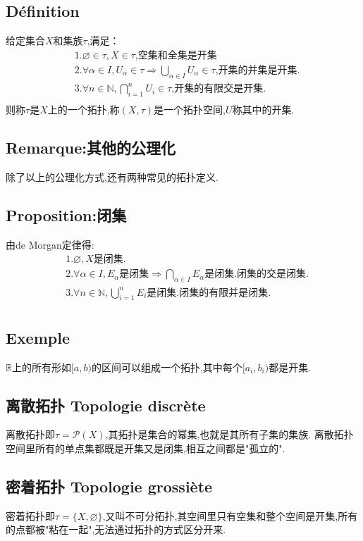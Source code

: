 \documentclass[12pt, a4paper, oneside]{ctexbook}
\newcommand{\R }{\mathbb{R}}%
\begin{document}
  \subsection{Définition}
  给定集合$X$和集族$\tau $,满足：
  $$
  \begin{aligned}&
  1.\varnothing\in\tau , X\in\tau\text{,空集和全集是开集}\\&
  2.\forall\alpha\in I,U_\alpha\in\tau \Rightarrow\bigcup_{\alpha\in I}U_\alpha\in\tau \text{,开集的并集是开集.}\\&
  3.\forall n\in\mathbb{N},\bigcap_{i=1}^{n}U_i\in\tau \text{,开集的有限交是开集.}\\
    \end{aligned}
  $$
  则称$\tau $是$X$上的一个拓扑,称$(X,\tau)$是一个拓扑空间,$U$称其中的开集.
  \subsection{Remarque:其他的公理化}
  除了以上的公理化方式,还有两种常见的拓扑定义.
  \subsection{Proposition:闭集}
  由de Morgan定律得:
  $$
  \begin{aligned}&
  1.\varnothing, X{ 是闭集.}\\&
  2.\forall\alpha\in I,E_\alpha\text{是闭集} \Rightarrow\bigcap_{\alpha\in I}E_\alpha \text{是闭集.闭集的交是闭集.}\\&
  3.\forall n\in\mathbb{N},\bigcup_{i=1}^{n}E_i \text{是闭集.闭集的有限并是闭集.}\\
    \end{aligned}
  $$
  \subsection{Exemple}
  $\R$上的所有形如$[a,b)$的区间可以组成一个拓扑,其中每个$[a_i,b_i)$都是开集.

  \subsection{离散拓扑 Topologie discrète}
  离散拓扑即$\tau=\mathcal{P} (X)$,其拓扑是集合的幂集,也就是其所有子集的集族.
  离散拓扑空间里所有的单点集都既是开集又是闭集,相互之间都是"孤立的".

  \subsection{密着拓扑 Topologie grossiète}
  密着拓扑即$\tau=\{X,\varnothing \}$,又叫不可分拓扑,其空间里只有空集和整个空间是开集,所有的点都被"粘在一起",无法通过拓扑的方式区分开来.\\
  
\end{document}

